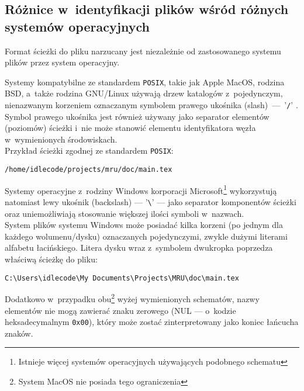\subsection{Różnice w~identyfikacji plików wśród różnych systemów operacyjnych}
\par
Format ścieżki do pliku narzucany jest niezależnie od zastosowanego systemu plików przez system operacyjny.

\par
Systemy kompatybilne ze standardem \texttt{POSIX}, takie jak Apple MacOS, rodzina BSD, a~także rodzina GNU/Linux używają drzew katalogów z~pojedynczym, nienazwanym korzeniem oznaczanym symbolem prawego ukośnika (slash)~---~'\texttt{/}' \cite{website:posix-standard}.\\
Symbol prawego ukośnika jest również używany jako separator elementów (poziomów) ścieżki i~nie może stanowić elementu identyfikatora węzła w~wymienionych środowiskach.\\
Przykład ścieżki zgodnej ze standardem \texttt{POSIX}:
\begin{center}
\texttt{/home/idlecode/projects/mru/doc/main.tex}
\end{center}

\par
Systemy operacyjne z~rodziny Windows korporacji Microsoft\footnote{Istnieje  więcej systemów operacyjnych używających podobnego schematu} wykorzystują natomiast lewy ukośnik (backslash) --- '\texttt{\textbackslash}' --- jako separator komponentów ścieżki oraz uniemożliwiają stosowanie większej ilości symboli w~nazwach.\\
System plików systemu Windows może posiadać kilka korzeni (po jednym dla każdego wolumenu/dysku) oznaczanych pojedynczymi, zwykle dużymi literami alfabetu łacińskiego. Litera dysku wraz z~symbolem dwukropka poprzedza właściwą ścieżkę do pliku:\\
\begin{center}
\texttt{C:\textbackslash Users\textbackslash idlecode\textbackslash My Documents\textbackslash Projects\textbackslash MRU\textbackslash doc\textbackslash main.tex}
\end{center}

\par
Dodatkowo w~przypadku obu\footnote{System MacOS nie posiada tego ograniczenia} wyżej wymienionych schematów, nazwy elementów nie mogą zawierać znaku zerowego (NUL --- o~kodzie heksadecymalnym \texttt{0x00}), który może zostać zinterpretowany jako koniec łańcucha znaków\cite{website:fixing-unix-linux-filenames}.

